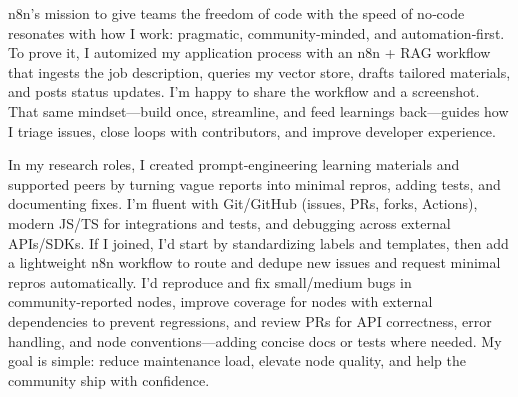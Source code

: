 n8n’s mission to give teams the freedom of code with the speed of no‑code resonates with how I work: pragmatic, community‑minded, and automation‑first. To prove it, I automized my application process with an n8n + RAG workflow that ingests the job description, queries my vector store, drafts tailored materials, and posts status updates. I’m happy to share the workflow and a screenshot. That same mindset—build once, streamline, and feed learnings back—guides how I triage issues, close loops with contributors, and improve developer experience.

In my research roles, I created prompt‑engineering learning materials and supported peers by turning vague reports into minimal repros, adding tests, and documenting fixes. I’m fluent with Git/GitHub (issues, PRs, forks, Actions), modern JS/TS for integrations and tests, and debugging across external APIs/SDKs. If I joined, I’d start by standardizing labels and templates, then add a lightweight n8n workflow to route and dedupe new issues and request minimal repros automatically. I’d reproduce and fix small/medium bugs in community‑reported nodes, improve coverage for nodes with external dependencies to prevent regressions, and review PRs for API correctness, error handling, and node conventions—adding concise docs or tests where needed. My goal is simple: reduce maintenance load, elevate node quality, and help the community ship with confidence.